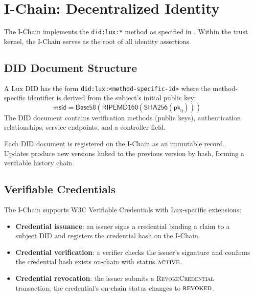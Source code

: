 \section{I-Chain: Decentralized Identity}
\label{sec:ichain}

The I-Chain implements the \texttt{did:lux:*} method as specified in
\cite{lux-id-did-specification}. Within the trust kernel, the I-Chain serves
as the root of all identity assertions.

\subsection{DID Document Structure}

\begin{definition}\label{def:did}
A Lux DID has the form \texttt{did:lux:<method-specific-id>} where the
method-specific identifier is derived from the subject's initial public key:
\[
    \mathsf{msid} = \mathsf{Base58}(\mathsf{RIPEMD160}(\mathsf{SHA256}(\mathsf{pk}_0)))
\]
The DID document contains verification methods (public keys), authentication
relationships, service endpoints, and a controller field.
\end{definition}

Each DID document is registered on the I-Chain as an immutable record. Updates
produce new versions linked to the previous version by hash, forming a verifiable
history chain.

\subsection{Verifiable Credentials}

The I-Chain supports W3C Verifiable Credentials with Lux-specific extensions:
\begin{itemize}
    \item \textbf{Credential issuance}: an issuer signs a credential binding a
          claim to a subject DID and registers the credential hash on the I-Chain.
    \item \textbf{Credential verification}: a verifier checks the issuer's
          signature and confirms the credential hash exists on-chain with status
          $\textsc{active}$.
    \item \textbf{Credential revocation}: the issuer submits a
          \textsc{RevokeCredential} transaction; the credential's on-chain status
          changes to $\textsc{revoked}$.
\end{itemize}

